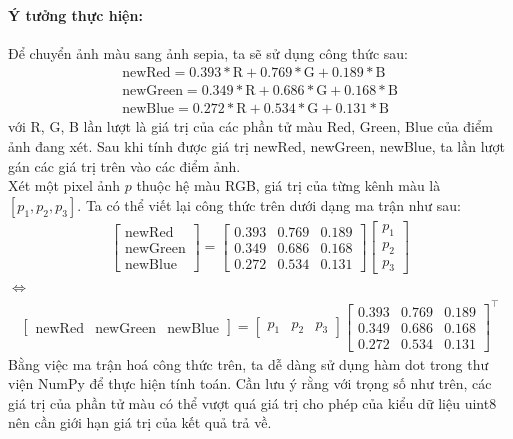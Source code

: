 \documentclass[]{article}
\begin{document}
\paragraph{Ý tưởng thực hiện:} Để chuyển ảnh màu sang ảnh sepia, ta sẽ sử dụng công thức sau:
\begin{align*}
  \text{newRed} = 0.393*\text{R} + 0.769*\text{G} + 0.189*\text{B} \\
  \text{newGreen} = 0.349*\text{R} + 0.686*\text{G} + 0.168*\text{B} \\
  \text{newBlue} = 0.272*\text{R} + 0.534*\text{G} + 0.131*\text{B} 
\end{align*}
với R, G, B lần lượt là giá trị của các phần tử màu Red, Green, Blue của điểm ảnh đang xét. Sau khi tính được giá trị newRed, newGreen, newBlue, ta lần lượt gán các giá trị trên vào các điểm ảnh. \\
Xét một pixel ảnh $p$ thuộc hệ màu RGB, giá trị của từng kênh màu là $[p_{1}, p_{2}, p_{3}]$. Ta có thể viết lại công thức trên dưới dạng ma trận như sau:
\begin{align*}
  \begin{bmatrix}
    \text{newRed} \\
    \text{newGreen} \\
    \text{newBlue}
  \end{bmatrix}
  =
  \begin{bmatrix}
    0.393 & 0.769 & 0.189 \\
    0.349 & 0.686 & 0.168 \\
    0.272 & 0.534 & 0.131
  \end{bmatrix}
  \begin{bmatrix}
    p_{1} \\
    p_{2} \\
    p_{3}
  \end{bmatrix}
\end{align*}
$\Leftrightarrow$
\begin{align*}
  \begin{bmatrix}
    \text{newRed} & \text{newGreen} & \text{newBlue}
  \end{bmatrix}
  =
  \begin{bmatrix}
    p_{1} & p_{2} & p_{3}
  \end{bmatrix}
  \begin{bmatrix}
    0.393 & 0.769 & 0.189 \\
    0.349 & 0.686 & 0.168 \\
    0.272 & 0.534 & 0.131
  \end{bmatrix}^\top
\end{align*}
Bằng việc ma trận hoá công thức trên, ta dễ dàng sử dụng hàm dot trong thư viện NumPy để thực hiện tính toán. Cần lưu ý rằng với trọng số như trên, các giá trị của phần tử màu có thể vượt quá giá trị cho phép của kiểu dữ liệu uint8 nên cần giới hạn giá trị của kết quả trả về.
\end{document}
